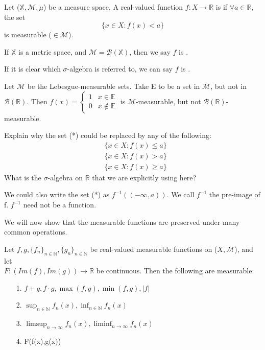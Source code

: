 \documentclass[11pt]{scrartcl}
\begin{document}
\begin{example}
Let ($\mathbb{X},\mathcal{M},\mu$) be a measure space. A real-valued function $f : X \rightarrow \mathbb{R}$ is  if $\forall a \in \mathbb{R}$, the set 
\begin{equation}
\{x\in X : f(x) < a\}\tag{*}
\end{equation}
is measurable ($\in \mathcal{M}$). 

If $\mathbb{X}$ is a metric space, and $\mathcal{M} = \mathcal{B}(\mathbb{X})$, then we say $f$ is .

If it is clear which $\sigma$-algebra is referred to, we can say $f$ is .
\end{example}

\begin{remark}
Let $\mathcal{M}$ be the Lebesgue-measurable sets. Take E to be a set in $\mathcal{M}$, but not in $\mathcal{B}(\mathbb{R})$. Then $f(x) = \begin{cases}
1 & x \in \mathbb{E} \\
0 & x \notin \mathbb{E} 
\end{cases}$ is $\mathcal{M}$-measurable, but not $\mathcal{B}(\mathbb{R})$-measurable.
\end{remark}

\begin{exercise}
Explain why the set (*) could be replaced by any of the following:
\begin{align*}
& \{x\in X : f(x) \leq a\}\\
& \{x\in X : f(x) > a\}\\
& \{x\in X : f(x) \geq a\}
\end{align*}
What is the $\sigma$-algebra on $\mathbb{R}$ that we are explicitly using here?
\end{exercise}

\begin{remark}
We could also write the set (*) as $f^{-1}((-\infty,a))$. We call $f^{-1}$ the pre-image of f. $f^{-1}$ need not be a function.
\end{remark}

We will now show that the measurable functions are preserved under many common operations.

\begin{theorem}
\label{measfunsthm}
Let $f, g,\{f_n\}_{n\in \mathbb{N}},\{g_n\}_{n\in \mathbb{N}}$ be real-valued measurable functions on ($X,\mathcal{M}$), and let \\$F: (Im(f),Im(g)) \rightarrow \mathbb{R}$ be continuous. Then the following are measurable:
\begin{itemize}
\item[1.] $f + g, f\cdot g, \max(f,g), \min(f,g), |f|$ 
\item[2.] $\sup_{n\in \mathbb{N}} f_n(x), \inf_{n\in \mathbb{N}} f_n(x)$
\item[3.] $\limsup_{n\rightarrow \infty} f_n(x), \liminf_{n\rightarrow \infty} f_n(x)$
\item[4.] F(f(x),g(x))
\end{itemize}
\end{theorem}
\end{document}
